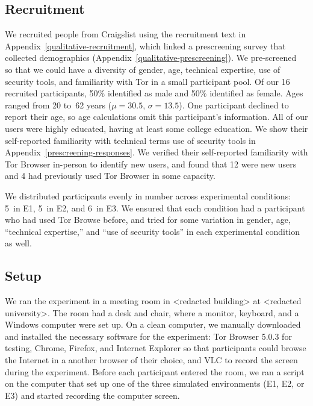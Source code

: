 \documentclass[USenglish,oneside,twocolumn]{article}
\begin{document}
\subsection{Recruitment}
We recruited people from Craigslist using the recruitment text in Appendix~\ref{qualitative-recruitment}, which linked a prescreening survey that collected demographics (Appendix~\ref{qualitative-prescreening}). We pre-screened~\cite{screening} so that we could have a diversity of gender, age, technical expertise, use of security tools, and familiarity with Tor in a small participant pool. Of our 16 recruited participants, 50\% identified as male and 50\% identified as female. Ages ranged from 20 to~62 years ($\mu = 30.5$, $\sigma = 13.5$). One participant declined to report their age, so age calculations omit this participant's information. All of our users were highly educated, having at least some college education. We show their self-reported familiarity with technical terms use of security tools in  Appendix~\ref{prescreening-responses}. We verified their self-reported familiarity with Tor Browser in-person to identify new users, and found that 12 were new users and 4 had previously used Tor Browser in some capacity.  



We distributed participants evenly in number across experimental conditions:  5~in E1, 5~in E2, and 6~in E3. We ensured that each condition had a participant who had used Tor Browse before, and tried for some variation in gender, age, ``technical expertise,'' and ``use of security tools'' in each experimental condition as well. 

\subsection{Setup} 
We ran the experiment in a meeting room in <redacted building> at <redacted university>. The room had a desk and chair, where a monitor, keyboard, and a Windows computer were set up. On a clean computer, we manually downloaded and installed the necessary software for the experiment: Tor Browser 5.0.3 for testing, Chrome, Firefox, and Internet Explorer so that participants could browse the Internet in a another browser of their choice, and VLC to record the screen during the experiment. Before each participant entered the room, we ran a script on the computer that
set up one of the three simulated environments (E1, E2, or E3) and started recording the computer screen.  
\end{document}

